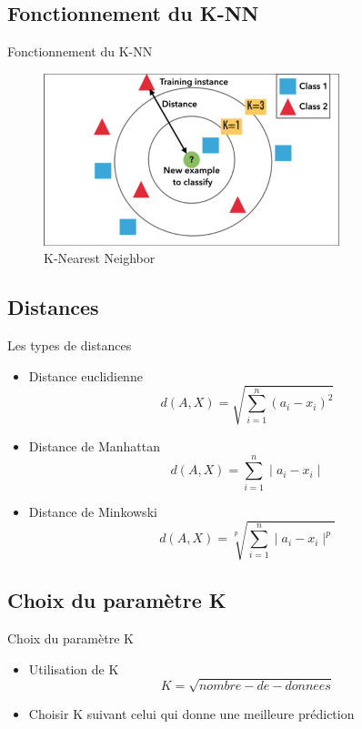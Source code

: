 \documentclass{beamer}
\begin{document}
\subsection{Fonctionnement du K-NN}
\begin{frame}{Fonctionnement du K-NN}
\begin{figure}[H]
    \includegraphics[width=\linewidth, height=5cm]{images/knn_sheama.png}
    \caption{K-Nearest Neighbor}
    \label{fig:L1}
\end{figure}
\end{frame}
\subsection{Distances}
\begin{frame}{Les types de distances}
\begin{itemize}
		\item Distance euclidienne
		$$d(A,X) = \sqrt{\sum_{i=1}^{n} (a_{i}-x_{i})^{2}}$$
		\item Distance de Manhattan\\
		$$d(A,X) = \sum_{i=1}^{n} \mid{a_{i}-x_{i}}\mid$$
		\item Distance de Minkowski
		$$d(A,X) = \sqrt[p]{\sum_{i=1}^{n} \mid{a_{i}-x_{i}}\mid^{p}}$$
\end{itemize}
\end{frame}
\subsection{Choix du paramètre K}
\begin{frame}{Choix du paramètre K}
\begin{itemize}
		\item Utilisation de K
		$$K=\sqrt{nombre-de-donnees }$$
		\item Choisir K suivant celui qui donne une meilleure prédiction
\end{itemize}
\end{frame}
\end{document}
